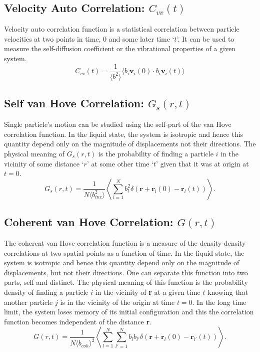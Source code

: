 \documentclass{article}
\begin{document}
\subsection{Velocity Auto Correlation: $C_{vv}(t)$} \label{sec::VACF}
Velocity auto correlation function is a statistical correlation between particle velocities at two points in time, 0 and some later time `$t$'. It can be used to measure the self-diffusion coefficient or the vibrational properties of a given system.
\begin{equation}
\label{eq:vacf}
 C_{vv}(t) = \frac{1}{\langle b^2\rangle}\langle b_i\textbf{v}_i(0)\cdot b_i\textbf{v}_i(t)\rangle
\end{equation} 

\subsection{Self van Hove Correlation: $G_s(r,t)$} \label{sec::Gofrt}
Single particle's motion can be studied using the self-part of the van Hove correlation function. In the liquid state, the system is isotropic and hence this quantity depend only on the magnitude of displacements not their directions. The physical meaning of $G_s(r,t)$ is the probability of finding a particle $i$ in the vicinity of some distance `$r$' at some other time `$t$' given that it was at origin at $t = 0$.
\begin{equation}
\label{eq:gr}
G_s(r,t) = \frac{1}{N\langle b_{inc}^2\rangle}\left\langle\sum\limits_{l=1}^N b_l^2\delta(\mathbf{r}+\mathbf{r}_l(0)-\mathbf{r}_l(t))\right\rangle.
\end{equation}

\subsection{Coherent van Hove Correlation: $G(r,t)$} \label{sec::Grt}
The coherent van Hove correlation function is a measure of the density-density correlations at two spatial points as a function of time. In the liquid state, the system is isotropic and hence this quantity depend only on the magnitude of displacements, but not their directions. One can separate this function into two parts, self and distinct. The physical meaning of this function is the probability density of finding a particle $i$ in the vicinity of \textbf{r} at a givrn time $t$ knowing that another particle $j$ is in the vicinity of the origin at time $t = 0$. In the long time limit, the system loses memory of its initial configuration and this the correlation function becomes independent of the distance \textbf{r}.
\begin{equation}
\label{eq:grc}
G(r,t) = \frac{1}{N\langle b_{coh}\rangle^2}\left\langle\sum\limits_{l=1}^N\sum\limits_{l'=1}^N b_lb_{l'}\delta(\mathbf{r}+\mathbf{r}_l(0)-\mathbf{r}_{l'}(t))\right\rangle.
\end{equation}
\end{document}
